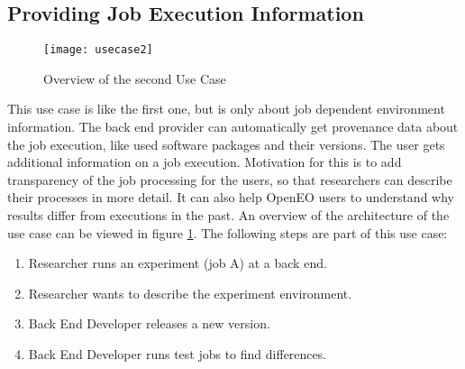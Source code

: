 \documentclass[draft,final]{vutinfth} %
\begin{document}
\subsection{Providing Job Execution Information}\label{UseCase2}
\begin{figure}[h]
	\centering
	\texttt{[image: usecase2]}
	\caption{Overview of the second Use Case}
	\label{fig:usecase2} %
\end{figure}
This use case is like the first one, but is only about job dependent environment information. The back end provider can automatically get provenance data about the job execution, like used software packages and their versions. The user gets additional information on a job execution. Motivation for this is to add transparency of the job processing for the users, so that researchers can describe their processes in more detail. It can also help OpenEO users to understand why results differ from executions in the past. An overview of the architecture of the use case can be viewed in figure \ref{fig:usecase2}. 
The following steps are part of this use case:
\begin{enumerate}
	\item Researcher runs an experiment (job A) at a back end.
	\item Researcher wants to describe the experiment environment.
	\item Back End Developer releases a new version.   
	\item Back End Developer runs test jobs to find differences.
\end{enumerate}
\end{document}
